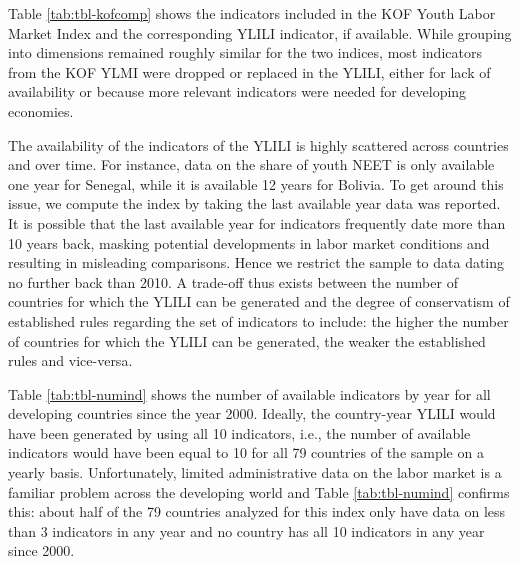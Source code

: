 \documentclass[
  a4paper, twoside, 12pt]{book}
\begin{document}

Table \ref{tab:tbl-kofcomp} shows the indicators included in the KOF Youth Labor Market Index \autocite{renold2014} and the corresponding YLILI indicator, if available. While grouping into dimensions remained roughly similar for the two indices, most indicators from the KOF YLMI were dropped or replaced in the YLILI, either for lack of availability or because more relevant indicators were needed for developing economies.

\begin{singlespacing}

\end{singlespacing}

The availability of the indicators of the YLILI is highly scattered across countries and over time. For instance, data on the share of youth NEET is only available one year for Senegal, while it is available 12 years for Bolivia. To get around this issue, we compute the index by taking the last available year data was reported. It is possible that the last available year for indicators frequently date more than 10 years back, masking potential developments in labor market conditions and resulting in misleading comparisons. Hence we restrict the sample to data dating no further back than 2010. A trade-off thus exists between the number of countries for which the YLILI can be generated and the degree of conservatism of established rules regarding the set of indicators to include: the higher the number of countries for which the YLILI can be generated, the weaker the established rules and vice-versa.

Table \ref{tab:tbl-numind} shows the number of available indicators by year for all developing countries since the year 2000. Ideally, the country-year YLILI would have been generated by using all 10 indicators, i.e., the number of available indicators would have been equal to 10 for all 79 countries of the sample on a yearly basis. Unfortunately, limited administrative data on the labor market is a familiar problem across the developing world and Table \ref{tab:tbl-numind} confirms this: about half of the 79 countries analyzed for this index only have data on less than 3 indicators in any year and no country has all 10 indicators in any year since 2000.

\begin{singlespacing}



\end{singlespacing}
\end{document}
